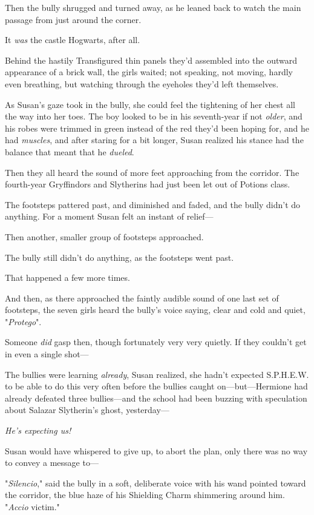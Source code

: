 Then the bully shrugged and turned away, as he leaned back to watch the main
passage from just around the corner.

It \emph{was} the castle Hogwarts, after all.

Behind the hastily Transfigured thin panels they'd assembled into the outward
appearance of a brick wall, the girls waited; not speaking, not moving, hardly
even breathing, but watching through the eyeholes they'd left themselves.

As Susan's gaze took in the bully, she could feel the tightening of her chest
all the way into her toes. The boy looked to be in his seventh-year if not
\emph{older}, and his robes were trimmed in green instead of the red they'd
been hoping for, and he had \emph{muscles}, and after staring for a bit longer,
Susan realized his stance had the balance that meant that he \emph{dueled}.

Then they all heard the sound of more feet approaching from the corridor. The
fourth-year Gryffindors and Slytherins had just been let out of Potions class.

The footsteps pattered past, and diminished and faded, and the bully didn't do
anything. For a moment Susan felt an instant of relief---

Then another, smaller group of footsteps approached.

The bully still didn't do anything, as the footsteps went past.

That happened a few more times.

And then, as there approached the faintly audible sound of one last set of
footsteps, the seven girls heard the bully's voice saying, clear and cold and
quiet, "\emph{Protego}".

Someone \emph{did} gasp then, though fortunately very very quietly. If they
couldn't get in even a single shot---

The bullies were learning \emph{already}, Susan realized, she hadn't expected
S.P.H.E.W. to be able to do this very often before the bullies caught
on---but---Hermione had already defeated three bullies---and the school had
been buzzing with speculation about Salazar Slytherin's ghost, yesterday---

\emph{He's expecting us!}

Susan would have whispered to give up, to abort the plan, only there was no way
to convey a message to---

"\emph{Silencio}," said the bully in a soft, deliberate voice with his wand
pointed toward the corridor, the blue haze of his Shielding Charm shimmering
around him. "\emph{Accio} victim."

